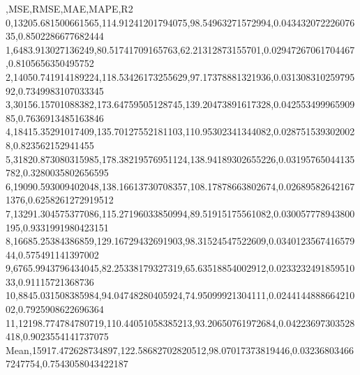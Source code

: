 ,MSE,RMSE,MAE,MAPE,R2
0,13205.681500661565,114.91241201794075,98.54963271572994,0.04343207222607635,0.8502286677682444
1,6483.913027136249,80.51741709165763,62.21312873155701,0.02947267061704467,0.8105656350495752
2,14050.741914189224,118.53426173255629,97.17378881321936,0.03130831025979592,0.7349983107033345
3,30156.15701088382,173.64759505128745,139.20473891617328,0.04255349996590985,0.7636913485163846
4,18415.35291017409,135.70127552181103,110.95302341344082,0.0287515393020028,0.823562152941455
5,31820.873080315985,178.38219576951124,138.94189302655226,0.03195765044135782,0.3280035802656595
6,19090.593009402048,138.16613730708357,108.17878663802674,0.026895826421671376,0.6258261272919512
7,13291.304575377086,115.27196033850994,89.51915175561082,0.030057778943800195,0.9331991980423151
8,16685.25384386859,129.16729432691903,98.31524547522609,0.034012356741657944,0.575491141397002
9,6765.9943796434045,82.25338179327319,65.63518854002912,0.023323249185951033,0.91115721368736
10,8845.031508385984,94.04748280405924,74.95099921304111,0.024414488866421002,0.7925908622696364
11,12198.774784780719,110.44051058385213,93.20650761972684,0.04223697303528418,0.9023554141737075
Mean,15917.472628734897,122.58682702820512,98.07017373819446,0.032368034667247754,0.7543058043422187
